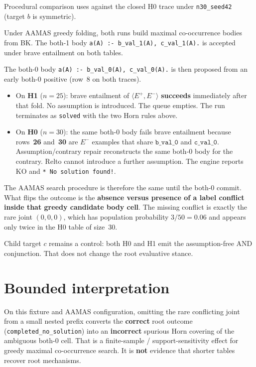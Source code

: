 \documentclass[11pt]{article}
\begin{document}
Procedural comparison uses
against the closed H0 trace under \texttt{n30\_seed42}
(target \(b\) is symmetric).

Under AAMAS greedy folding, both runs build maximal co-occurrence bodies from
BK.
The both-1 body
\texttt{a(A) :- b\_val\_1(A), c\_val\_1(A).}
is accepted under brave entailment on both tables.

The both-0 body
\texttt{a(A) :- b\_val\_0(A), c\_val\_0(A).}
is then proposed from an early both-0 positive (row~8 on both traces).

\begin{itemize}
  \item On \textbf{H1} (\(n{=}25\)): brave entailment of
    \(\langle E^+,E^-\rangle\) \textbf{succeeds} immediately after that fold.
    No assumption is introduced.
    The queue empties.
    The run terminates as \texttt{solved} with the two Horn rules above.
  \item On \textbf{H0} (\(n{=}30\)): the same both-0 body fails brave
    entailment because rows~\textbf{26} and~\textbf{30} are \(E^-\) examples
    that share \(\mathtt{b\_val\_0}\) and \(\mathtt{c\_val\_0}\).
    Assumption/contrary repair reconstructs the same both-0 body for the
    contrary.
    Relto cannot introduce a further assumption.
    The engine reports KO and \texttt{* No solution found!}.
\end{itemize}

The AAMAS search procedure is therefore the same until the both-0 commit.
What flips the outcome is the \textbf{absence versus presence of a label
conflict inside that greedy candidate body cell}.
The missing conflict is exactly the rare joint \((0,0,0)\), which has
population probability \(3/50=0.06\) and appears only twice in the H0 table of
size~30.

Child target \(c\) remains a control: both H0 and H1 emit the assumption-free
AND conjunction.
That does not change the root evaluative stance.

\section{Bounded interpretation}

On this fixture and AAMAS configuration, omitting the rare conflicting joint
from a small nested prefix converts the \textbf{correct} root outcome
(\texttt{completed\_no\_solution}) into an \textbf{incorrect} spurious Horn
covering of the ambiguous both-0 cell.
That is a finite-sample / support-sensitivity effect for greedy maximal
co-occurrence search.
It is \textbf{not} evidence that shorter tables recover root mechanisms.
\end{document}
